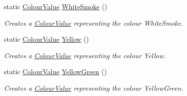 \begin{DoxyCompactItemize}
static \hyperlink{classMezzanine_1_1ColourValue}{ColourValue} \hyperlink{classMezzanine_1_1ColourValue_abb9bc9db83cf1918ae9fcb619a2a4b95}{WhiteSmoke} ()
\begin{DoxyCompactList}\small\item\em Creates a \hyperlink{classMezzanine_1_1ColourValue}{ColourValue} representing the colour WhiteSmoke. \item\end{DoxyCompactList}\item 
static \hyperlink{classMezzanine_1_1ColourValue}{ColourValue} \hyperlink{classMezzanine_1_1ColourValue_a0f78fead16c36124a2ecbb14de1bacc3}{Yellow} ()
\begin{DoxyCompactList}\small\item\em Creates a \hyperlink{classMezzanine_1_1ColourValue}{ColourValue} representing the colour Yellow. \item\end{DoxyCompactList}\item 
static \hyperlink{classMezzanine_1_1ColourValue}{ColourValue} \hyperlink{classMezzanine_1_1ColourValue_a1954ad47e1207f9920a903d592077bda}{YellowGreen} ()
\begin{DoxyCompactList}\small\item\em Creates a \hyperlink{classMezzanine_1_1ColourValue}{ColourValue} representing the colour YellowGreen. \item\end{DoxyCompactList}\end{DoxyCompactItemize}
